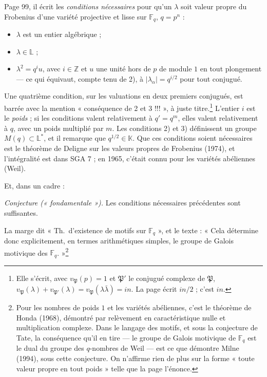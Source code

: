 \documentclass[11pt,a4paper]{article}
\begin{document}
Page 99, il écrit les \emph{conditions nécessaires} pour qu'un $\lambda$ soit
valeur propre du Frobenius d'une variété projective et lisse sur
$\mathbb{F}_{q}$, $q = p^{n}$ :
\begin{itemize}
  \item[1)] $\lambda$ est un entier algébrique ;
  \item[2)] $\lambda \in \mathbb{L}$ ;
  \item[3)] $\lambda^{2} = q^{i}u$, avec $i \in \mathbb{Z}$ et $u$ une unité hors
  de $p$ de module $1$ en tout plongement --- ce qui équivaut, compte tenu de 2),
  à $|\lambda_{\alpha}| = q^{i/2}$ pour tout conjugué.
\end{itemize}
Une quatrième condition, sur les valuations en deux premiers conjugués, est
barrée avec la mention « conséquence de 2 et 3 !!! », à juste
titre.\footnote{Elle s'écrit, avec $v_{\mathfrak{P}}(p) = 1$ et $\mathfrak{P}'$
le conjugué complexe de $\mathfrak{P}$, $v_{\mathfrak{P}}(\lambda) +
v_{\mathfrak{P}'}(\lambda) = v_{\mathfrak{P}}(\lambda\bar{\lambda}) = in$. La
page écrit $in/2$ ; c'est $in$.} L'entier $i$ est le \emph{poids} ; si les
conditions valent relativement à $q' = q^{m}$, elles valent relativement à $q$,
avec un poids multiplié par $m$. Les conditions 2) et 3) définissent un groupe
$M(q) \subset \mathbb{L}^{*}$, et il remarque que $q^{1/2} \in \mathbb{K}$. Que
ces conditions soient nécessaires est le théorème de Deligne sur les valeurs
propres de Frobenius (1974), et l'intégralité est dans SGA 7 ; en 1965, c'était
connu pour les variétés abéliennes (Weil).

Et, dans un cadre :

\emph{Conjecture (« fondamentale »).} Les conditions nécessaires précédentes sont
suffisantes.

La marge dit « Th.\ d'existence de motifs sur $\mathbb{F}_{q}$ », et le texte :
« Cela détermine donc explicitement, en termes arithmétiques simples, le groupe
de Galois motivique des $\mathbb{F}_{q}$. »\footnote{Pour les nombres de poids
$1$ et les variétés abéliennes, c'est le théorème de Honda (1968), démontré par
relèvement en caractéristique nulle et multiplication complexe. Dans le
langage des motifs, et sous la conjecture de Tate, la conséquence qu'il en tire
--- le groupe de Galois motivique de $\mathbb{F}_{q}$ est le dual du groupe des
$q$-nombres de Weil --- est ce que démontre Milne (1994), sous cette conjecture. On n'affirme rien
de plus sur la forme « toute valeur propre en tout poids » telle que la page
l'énonce.}
\end{document}

